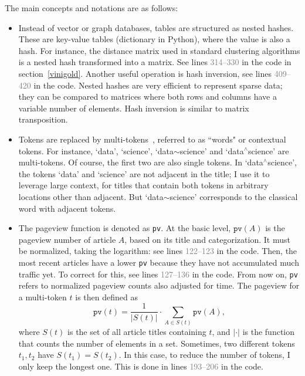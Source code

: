 \documentclass[oneside,10pt]{book}
\begin{document}
\noindent The main concepts and notations are as follows:
\vspace{1ex}
\begin{itemize}
\item Instead of vector or graph databases, tables are structured as \textcolor{index}{nested hashes}. These are
 key-value tables (dictionary in Python), where the value is also a hash. For instance, the 
\textcolor{index}{distance matrix} used in standard clustering algorithms 
 is a nested hash transformed into a matrix. See lines \textcolor{gray}{314--330} in the code in section~\ref{vinigold}. Another useful operation is 
\textcolor{index}{hash inversion}, 
see lines \textcolor{gray}{409--420} in the code.
Nested hashes are very efficient to represent sparse data; they can be compared to matrices where both rows and columns have a variable number of elements. 
Hash inversion is similar to matrix transposition. 
\vspace{1ex}

\item Tokens are replaced by \textcolor{index}{multi-tokens}~\cite{mtokens}, 
referred to as ``words" or 
\textcolor{index}{contextual tokens}. For instance, `data', `science', 
 `data$\sim$science' and `data$^\wedge$science' are multi-tokens. Of course, the first two are also single tokens. In `data$^\wedge$science', the tokens `data' and `science' are not adjacent in the title; I use it to leverage large context, for titles that contain both tokens in arbitrary locations other than adjacent. But `data$\sim$science'  corresponds to the classical word
 with adjacent tokens.
\vspace{1ex}

\item The pageview function is denoted as \texttt{pv}. At the basic level, $\texttt{pv}(A)$ is the pageview number of article $A$, based on its title and categorization. 
It must be normalized, taking the logarithm: see lines \textcolor{gray}{122--123} in the code. Then, the most recent articles have a lower 
\texttt{pv} because they have not accumulated much traffic yet. To correct for this, see lines \textcolor{gray}{127--136} in the code.  From now on,
 \texttt{pv} refers to normalized pageview counts also adjusted for time. The pageview for a multi-token $t$ is then defined as
\begin{equation}
\texttt{pv}(t) = \frac{1}{|S(t)|}\cdot \sum_{A\in S(t)} \texttt{pv}(A), \label{mur28u}
\end{equation}
where $S(t)$ is the set of all article titles containing $t$, and $|\cdot|$ is the function that counts the number of elements in a set. Sometimes, two different
 tokens $t_1, t_2$ have $S(t_1)=S(t_2)$. In this case, to reduce the number of tokens, I only keep the longest one. This is done
 in lines \textcolor{gray}{193--206} in the code. 
\vspace{1ex}


\end{itemize}
\end{document}
